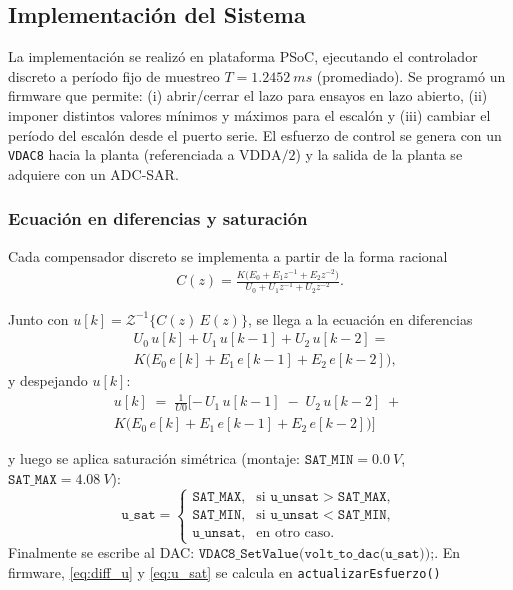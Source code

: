 \subsection{Implementación del Sistema}
La implementación se realizó en plataforma PSoC, ejecutando el controlador discreto a período fijo de muestreo \(T=\SI{1.2452}{ms}\) (promediado). Se programó un firmware que permite: (i) abrir/cerrar el lazo para ensayos en lazo abierto, (ii) imponer distintos valores mínimos y máximos para el escalón y (iii) cambiar el período del escalón desde el puerto serie. El esfuerzo de control se genera con un \texttt{VDAC8} hacia la planta (referenciada a \(\mathrm{VDDA}/2\)) y la salida de la planta se adquiere con un ADC-SAR.

\subsubsection{Ecuación en diferencias y saturación}
Cada compensador discreto se implementa a partir de la forma racional
\begin{equation}
	\label{eq:Cz_form}
	\begin{split}
		C(z)
		= \frac{K\big(E_0 + E_1 z^{-1} + E_2 z^{-2}\big)}
		{U_0 + U_1 z^{-1} + U_2 z^{-2}}.
	\end{split}
\end{equation}

Junto con \(u[k]=\mathcal{Z}^{-1}\!\big\{C(z)\,E(z)\big\}\), se llega a la ecuación en diferencias
\begin{equation}
	\label{eq:diff_balance}
	\begin{aligned}
		&U_0\,u[k] + U_1\,u[k-1] + U_2\,u[k-2]
		=\\
		 & K\Big(E_0\,e[k] + E_1\,e[k-1] + E_2\,e[k-2]\Big),
	\end{aligned}
\end{equation}
y despejando \(u[k]\):
\begin{equation}
	\label{eq:diff_u}
	\begin{split}
		u[k] \;=\;\frac{1}{U0}[
		-\,U_1\,u[k-1] \;-\; U_2\,u[k-2]
			\;+\; \\K\big(E_0\,e[k] + E_1\,e[k-1] + E_2\,e[k-2]\big)]
	\end{split}
\end{equation}


y luego se aplica saturación simétrica (montaje: \(\texttt{SAT\_MIN}=\SI{0.0}{V}\), \(\texttt{SAT\_MAX}=\SI{4.08}{V}\)):
\begin{equation}
	\label{eq:u_sat}
	\texttt{u\_sat}=
	\begin{cases}
		\texttt{SAT\_MAX}, & \text{si } \texttt{u\_unsat}>\texttt{SAT\_MAX},\\
		\texttt{SAT\_MIN}, & \text{si } \texttt{u\_unsat}<\texttt{SAT\_MIN},\\
		\texttt{u\_unsat}, & \text{en otro caso.}
	\end{cases}
\end{equation}
Finalmente se escribe al DAC: \(\texttt{VDAC8\_SetValue(volt\_to\_dac(u\_sat));}\).
En firmware, \eqref{eq:diff_u} y \eqref{eq:u_sat} se calcula en \texttt{actualizarEsfuerzo()}


